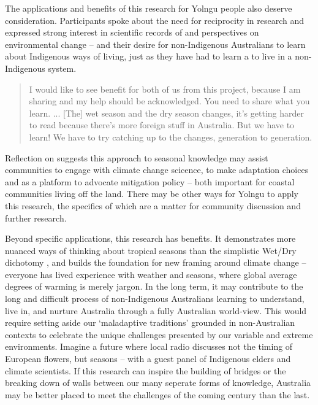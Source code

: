 The applications and benefits of this research for Yolngu people also deserve
consideration.  Participants spoke about the need for reciprocity in research
and expressed strong interest in scientific records of and perspectives on
environmental change -- and their desire for non-Indigenous Australians to
learn about Indigenous ways of living, just as they have had to learn a to
live in a non-Indigenous system.
\begin{quote}
    I would like to see benefit for both of us from this project, because I am
    sharing and my help should be acknowledged.  You need to share what you learn. ...
    [The] wet season and the dry season changes, it's getting harder to read
    because there's more foreign stuff in Australia.  But we have to learn!
    We have to try catching up to the changes, generation to generation.
\end{quote}
Reflection on \citet{petheram2010} suggests this approach to seasonal knowledge
may assist communities to engage with climate change scicence, to make
adaptation choices and as a platform to advocate mitigation policy -- both
important for coastal communities living off the land.  There may be other
ways for Yolngu to apply this research, the specifics of which are a matter for
community discussion and further research.


Beyond specific applications, this research has benefits.  It
demonstrates more nuanced ways of thinking about tropical seasons than the
simplistic Wet/Dry dichotomy \citep{willmett2009}, and builds the foundation
for new framing around climate change -- everyone has lived experience with
weather and seasons, where global average degrees of warming is merely jargon.
%
In the long term, it may contribute to the long and difficult process of
non-Indigenous Australians learning to understand, live in, and nurture
Australia through a fully Australian world-view.  This would require setting
aside our `maladaptive traditions' grounded in non-Australian contexts
\citep{flannery1994} to celebrate the unique challenges presented by our variable and extreme
environments.  Imagine a future where local radio discusses not the timing of
European flowers, but seasons -- with a guest panel of Indigenous elders and
climate scientists.
%
If this research can inspire the building of bridges or the breaking down of walls
between our many seperate forms of knowledge, Australia may be better placed
to meet the challenges of the coming century than the last.

